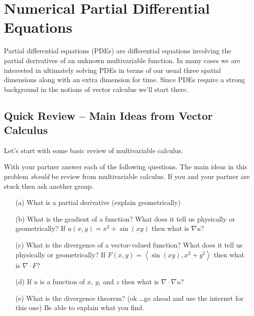 \chapter{Numerical Partial Differential Equations}
Partial differential equations (PDEs) are differential equations involving the partial
derivatives of an unknown multivariable function.  In many cases we are interested in
ultimately solving PDEs in terms of our usual three spatial dimensions along with an extra
dimension for time.  Since PDEs require a strong background in the notions of vector
calculus we'll start there.

\section{Quick Review -- Main Ideas from Vector Calculus}
Let's start with some basic review of multivariable calculus.
\begin{problem}
    With your partner answer each of the following questions. The main ideas in this
    problem {\it should} be review from multivariable calculus.  If you and your partner
    are stuck then ask another group. 
    \begin{enumerate}
        \item[(a)] What is a partial derivative (explain geometrically)
        \item[(b)] What is the gradient of a function? What does it tell us physically or geometrically? If
            $u(x,y)=x^2+\sin(xy)$ then what is $\nabla u$?
        \item[(c)] What is the divergence of a vector-valued function? What does it tell
            us physically or geometrically? If $F(x,y)=\left< \sin(xy), x^2+y^2\right>$
            then what is $\nabla \cdot F$?
        \item[(d)] If $u$ is a function of $x$, $y$, and $z$ then what is $\nabla \cdot
            \nabla u$?
        \item[(e)] What is the divergence theorem? (ok \ldots go ahead and use the
            internet for this one) Be able to explain what you find. 
    \end{enumerate}
\end{problem}

